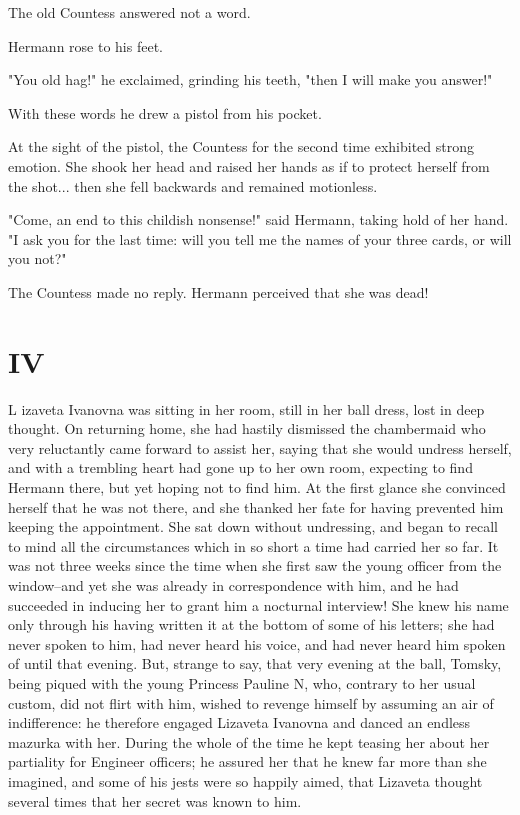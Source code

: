 The old Countess answered not a word.

Hermann rose to his feet.

"You old hag!" he exclaimed, grinding his teeth, "then I will make you
answer!"

With these words he drew a pistol from his pocket.

At the sight of the pistol, the Countess for the second time exhibited
strong emotion. She shook her head and raised her hands as if to
protect herself from the shot... then she fell backwards and remained
motionless.

"Come, an end to this childish nonsense!" said Hermann, taking hold of
her hand. "I ask you for the last time: will you tell me the names of
your three cards, or will you not?"

The Countess made no reply. Hermann perceived that she was dead!



\section{IV}


\lettrine[lines=3,lhang=0.11,lraise=0,loversize=0.05]{L}{}%
izaveta Ivanovna was sitting in her room, still in her ball dress,
lost in deep thought. On returning home, she had hastily dismissed the
chambermaid who very reluctantly came forward to assist her, saying
that she would undress herself, and with a trembling heart had gone up
to her own room, expecting to find Hermann there, but yet hoping not
to find him. At the first glance she convinced herself that he was not
there, and she thanked her fate for having prevented him keeping the
appointment. She sat down without undressing, and began to recall to
mind all the circumstances which in so short a time had carried her so
far. It was not three weeks since the time when she first saw the
young officer from the window--and yet she was already in
correspondence with him, and he had succeeded in inducing her to grant
him a nocturnal interview! She knew his name only through his having
written it at the bottom of some of his letters; she had never spoken
to him, had never heard his voice, and had never heard him spoken of
until that evening. But, strange to say, that very evening at the
ball, Tomsky, being piqued with the young Princess Pauline N, who,
contrary to her usual custom, did not flirt with him, wished to
revenge himself by assuming an air of indifference: he therefore
engaged Lizaveta Ivanovna and danced an endless mazurka with her.
During the whole of the time he kept teasing her about her partiality
for Engineer officers; he assured her that he knew far more than she
imagined, and some of his jests were so happily aimed, that Lizaveta
thought several times that her secret was known to him.

